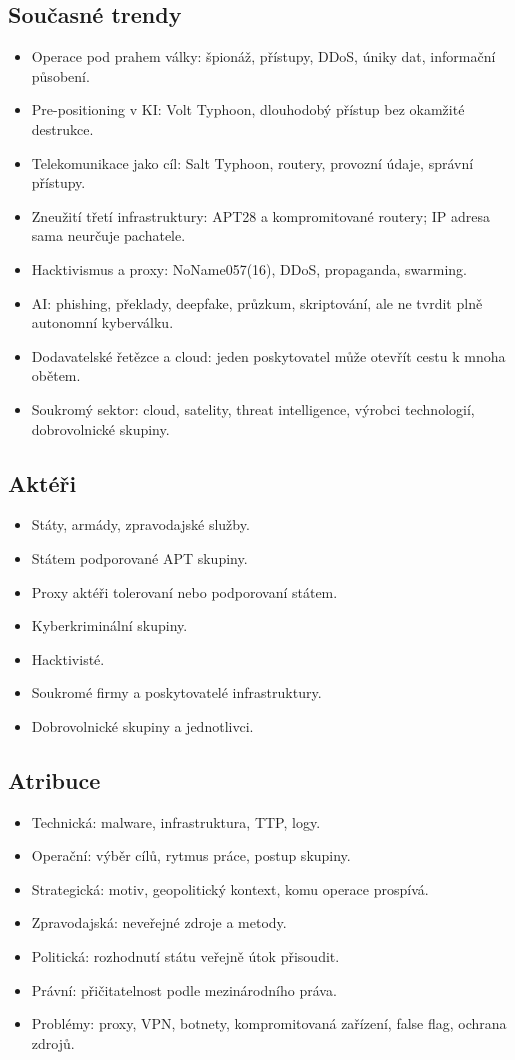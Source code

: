 \documentclass[10pt,a4paper]{article}
\newcommand{\blok}[1]{\subsection*{#1}}
\begin{document}
\blok{Současné trendy}
\begin{itemize}
  \item Operace pod prahem války: špionáž, přístupy, DDoS, úniky dat, informační působení.
  \item Pre-positioning v KI: Volt Typhoon, dlouhodobý přístup bez okamžité destrukce.
  \item Telekomunikace jako cíl: Salt Typhoon, routery, provozní údaje, správní přístupy.
  \item Zneužití třetí infrastruktury: APT28 a kompromitované routery; IP adresa sama neurčuje pachatele.
  \item Hacktivismus a proxy: NoName057(16), DDoS, propaganda, swarming.
  \item AI: phishing, překlady, deepfake, průzkum, skriptování, ale ne tvrdit plně autonomní kyberválku.
  \item Dodavatelské řetězce a cloud: jeden poskytovatel může otevřít cestu k mnoha obětem.
  \item Soukromý sektor: cloud, satelity, threat intelligence, výrobci technologií, dobrovolnické skupiny.
\end{itemize}

\blok{Aktéři}
\begin{itemize}
  \item Státy, armády, zpravodajské služby.
  \item Státem podporované APT skupiny.
  \item Proxy aktéři tolerovaní nebo podporovaní státem.
  \item Kyberkriminální skupiny.
  \item Hacktivisté.
  \item Soukromé firmy a poskytovatelé infrastruktury.
  \item Dobrovolnické skupiny a jednotlivci.
\end{itemize}

\blok{Atribuce}
\begin{itemize}
  \item Technická: malware, infrastruktura, TTP, logy.
  \item Operační: výběr cílů, rytmus práce, postup skupiny.
  \item Strategická: motiv, geopolitický kontext, komu operace prospívá.
  \item Zpravodajská: neveřejné zdroje a metody.
  \item Politická: rozhodnutí státu veřejně útok přisoudit.
  \item Právní: přičitatelnost podle mezinárodního práva.
  \item Problémy: proxy, VPN, botnety, kompromitovaná zařízení, false flag, ochrana zdrojů.
\end{itemize}
\end{document}
